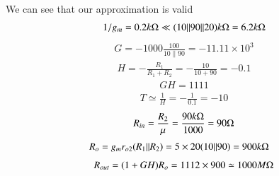 \begin{enumerate}[label=\thesubsection.\arabic*.,ref=\thesubsection.\theenumi]
We can see that our approximation is valid
\begin{align}
    1 / g_{m}=0.2 k\ohm \ll (10\|90\| 20)k\ohm = 6.2k\ohm 
\end{align}
\begin{align}
    G =-1000 \frac{100}{10 \| 90}=-11.11 \times 10^{3}
\end{align}
\begin{align}
    H=-\frac{R_{1}}{R_{1}+R_{2}}=-\frac{10}{10+90}=-0.1
\end{align}
\begin{align}
    GH=1111
\end{align}
\begin{align}
    T \simeq \frac{1}{H} = -\frac{1}{0.1} = -10
\end{align}
\begin{align}
    R_{in}=\frac{R_{2}}{\mu}=\frac{90k\ohm}{1000}=90\ohm
\end{align}
\begin{align}
    R_{o} &=g_{m} r_{o 2}(R_{1} \| R_{2}) =5 \times 20(10 \| 90)=900k\ohm
\end{align}
\begin{align}
    R_{out}=(1+GH) R_{o}=1112 \times 900 \simeq 1000M\ohm
\end{align}

\end{enumerate}